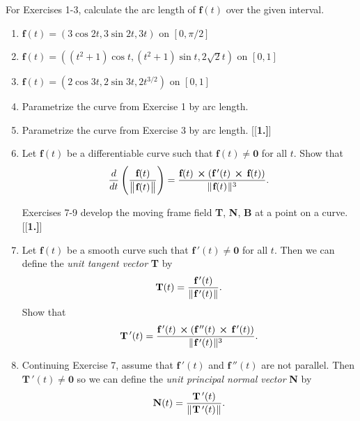 \startexercises\label{sec1dot9}
\par\noindent For Exercises 1-3, calculate the arc length of $\textbf{f}(t)$ over the given interval.
\begin{enumerate}[\bfseries 1.]
 \item $\textbf{f}(t) = (3\cos 2t, 3\sin 2t, 3t)$ on $[0,\pi/2]$
 \item $\textbf{f}(t) = ((t^2 + 1)\cos t, (t^2 + 1)\sin t, 2\sqrt{2} t)$ on $[0,1]$
 \item $\textbf{f}(t) = (2\cos 3t, 2\sin 3t, 2t^{3/2})$ on $[0,1]$
 \item Parametrize the curve from Exercise 1 by arc length.
 \item Parametrize the curve from Exercise 3 by arc length.
[{[\bfseries 1.]}]
 \item Let $\textbf{f}(t)$ be a differentiable curve such that $\textbf{f}(t) \ne \textbf{0}$ for all $t$. Show that
  \begin{displaymath}
   \frac{d}{dt} \left( \dfrac{\textbf{f}(t)}{\bigl\lVert\mspace{1mu}\textbf{f}(t)\mspace{1mu}\bigr\rVert} \right) =
    \dfrac{\textbf{f}(t)\, \bm{\times} (\textbf{f}\,'(t)\, \bm{\times} \,\textbf{f}(t))}{\lVert\mspace{1mu}\textbf{f}(t)\mspace{1mu}\rVert^3} .
  \end{displaymath}
\par\noindent Exercises 7-9 develop the moving frame field \textbf{T}, \textbf{N}, \textbf{B} at a point on a
curve.
[{[\bfseries 1.]}]
 \item Let $\textbf{f}(t)$ be a smooth curve such that $\textbf{f}\,'(t) \ne \textbf{0}$ for all $t$. Then we can
  define the \emph{unit tangent vector} \textbf{T} by
  \begin{displaymath}
   \textbf{T}(t) = \dfrac{\textbf{f}\,'(t)}{\lVert\mspace{1mu}\textbf{f}\,'(t)\mspace{1mu}\rVert} .
  \end{displaymath}
  Show that
  \begin{displaymath}
   \textbf{T}\,'(t) = \dfrac{\textbf{f}\,'(t)\, \bm{\times} (\textbf{f}\,''(t)\, \bm{\times} \,\textbf{f}\,'(t))}{
    \lVert\mspace{1mu}\textbf{f}\,'(t)\mspace{1mu}\rVert^3} .
  \end{displaymath}
 \item Continuing Exercise 7, assume that $\textbf{f}\,'(t)$ and $\textbf{f}\,''(t)$ are not parallel.
  Then $\textbf{T}\,'(t) \ne \textbf{0}$ so we can define the \emph{unit principal normal vector} \textbf{N} by
  \begin{displaymath}
   \textbf{N}(t) = \dfrac{\textbf{T}\,'(t)}{\norm{\textbf{T}\,'(t)}} .

\end{displaymath}
\end{enumerate}
